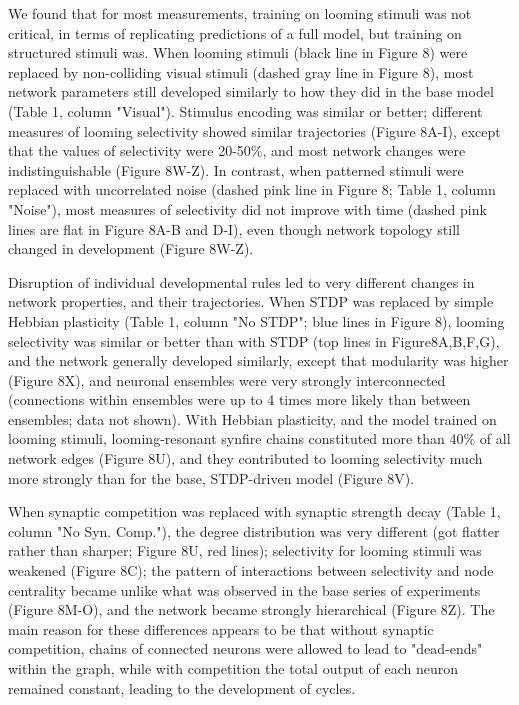 \documentclass{article}
\begin{document}
We found that for most measurements, training on looming stimuli was not critical, in terms of replicating predictions of a full model, but training on structured stimuli was. When looming stimuli (black line in Figure 8) were replaced by non-colliding visual stimuli (dashed gray line in Figure 8), most network parameters still developed similarly to how they did in the base model (Table 1, column "Visual"). Stimulus encoding was similar or better; different measures of looming selectivity showed similar trajectories (Figure 8A-I), except that the values of selectivity were 20-50\%, and most network changes were indistinguishable (Figure 8W-Z). In contrast, when patterned stimuli were replaced with uncorrelated noise (dashed pink line in Figure 8; Table 1, column "Noise"), most measures of selectivity did not improve with time (dashed pink lines are flat in Figure 8A-B and D-I), even though network topology still changed in development (Figure 8W-Z).

Disruption of individual developmental rules led to very different changes in network properties, and their trajectories. When STDP was replaced by simple Hebbian plasticity (Table 1, column "No STDP"; blue lines in Figure 8), looming selectivity was similar or better than with STDP (top lines in Figure8A,B,F,G), and the network generally developed similarly, except that modularity was higher (Figure 8X), and neuronal ensembles were very strongly interconnected (connections within ensembles were up to 4 times more likely than between ensembles; data not shown). With Hebbian plasticity, and the model trained on looming stimuli, looming-resonant synfire chains constituted more than 40\% of all network edges (Figure 8U), and they contributed to looming selectivity much more strongly than for the base, STDP-driven model (Figure 8V).

When synaptic competition was replaced with synaptic strength decay (Table 1, column "No Syn. Comp."), the degree distribution was very different (got flatter rather than sharper; Figure 8U, red lines); selectivity for looming stimuli was weakened (Figure 8C); the pattern of interactions between selectivity and node centrality became unlike what was observed in the base series of experiments (Figure 8M-O), and the network became strongly hierarchical (Figure 8Z). The main reason for these differences appears to be that without synaptic competition, chains of connected neurons were allowed to lead to "dead-ends" within the graph, while with competition the total output of each neuron remained constant, leading to the development of cycles. 
\end{document}
